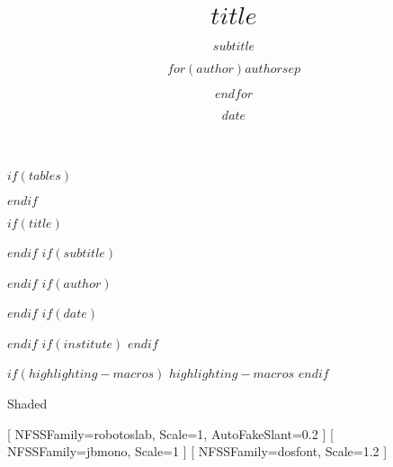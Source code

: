 \usepackage{fontspec}         %
\usepackage[skins]{tcolorbox} %
\usepackage{tikz}             %
\usepackage{calc}             %
\usepackage[
    $if(lang)$$lang$$else$en-US$endif$
]{datetime2}                  %
\usepackage{beamerbaseframe}
\usepackage{beamerbasemisc}
\usepackage{beamerbasetemplates}
\usetikzlibrary{calc}         %

\usepackage{hyperref} %
\usepackage{ulem}     %
\providecommand{\tightlist}{\setlength{\itemsep}{0pt}\setlength{\parskip}{0pt}}

$if(tables)$
\usepackage{longtable,booktabs,array}
\usepackage{beamerbasetitle}
\usepackage{beamerbasesection}
\usepackage{beamerbaseoverlay}
$endif$


$if(title)$
\title{$title$}
$endif$
$if(subtitle)$
\subtitle{$subtitle$}
$endif$
$if(author)$
\author{$for(author)$$author$$sep$ \and $endfor$}
$endif$
$if(date)$
\date{$date$}
$endif$
$if(institute)$
$endif$

$if(highlighting-macros)$
$highlighting-macros$
$endif$

\ifcsname Shaded\endcsname
\else
    \newenvironment{Shaded}{}{}
\fi
{}

[ %
    NFSSFamily=robotoslab,
    Scale=1,
    AutoFakeSlant=0.2
]
[ %
    NFSSFamily=jbmono,
    Scale=1
]
[ %
    NFSSFamily=dosfont,
    Scale=1.2
]

